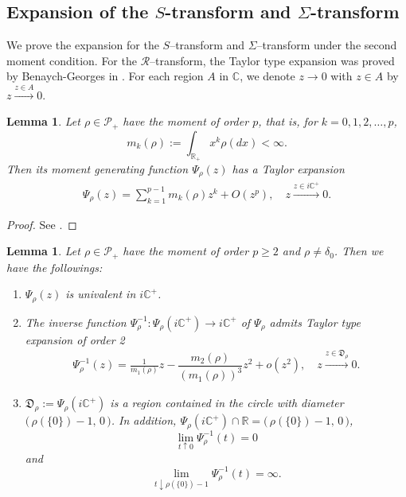 \documentclass[12pt]{amsart}
\newtheorem{lem}[thm]{Lemma}
\theoremstyle{definition}
\numberwithin{equation}{section}
\begin{document}
\subsection{Expansion of the $S$-transform and $\Sigma$-transform}
We prove the expansion for the $S$--transform and $\Sigma$--transform 
under the second moment condition.
For the $\mathcal{R}$--transform, the Taylor type expansion was proved by Benaych-Georges 
in \cite{BG06}. 
For each region $A$ in ${\mathbb{C}}$,
we denote $z \to 0$ with $z \in A$
by $z \overset{z \in A}{\longrightarrow} 0$.
\begin{lem}\label{lemM}
	Let $\rho \in \mathcal{P}_+$ have the moment of order $p$, that is,
	for $k=0,1,2,\ldots ,p$,
		\[
		m_{k}(\rho):=\int_{{\mathbb{R}}_+} x^k \rho (dx) < \infty.
		\]
	Then its moment generating function $\Psi_{\rho}(z)$ has a Taylor expansion
		\begin{align*}
		\Psi_{\rho}(z) = \sum_{k=1}^{p-1} m_{k}(\rho) z^k + O(z^{p}), 
		\quad z \overset{z \in i{\mathbb{C}}^+}{\longrightarrow} 0.
		\end{align*} 
\end{lem}
\begin{proof}
See \cite{Ak69}.
\end{proof}
\begin{lem}\label{lem}
	Let $\rho \in \mathcal{P}_+$ have the moment of order $p\geq 2$
	 and $\rho \not = \delta_0$.
	 Then we have the followings:
	\begin{enumerate}
		\item[\rm{(1)}] $\Psi_{\rho}(z)$ is univalent in $i{\mathbb{C}}^+$.
		\item[\rm{(2)}] The inverse function 
	$\Psi^{-1}_{\rho} : \Psi_{\rho}(i{\mathbb{C}}^+) \to i{\mathbb{C}}^+$ 
	of $\Psi_{\rho}$ 
	admits Taylor type expansion of order 2
	\begin{align*}
		\Psi^{-1}_{\rho} (z) = \frac{1}{m_1(\rho)} z -\dfrac{m_{2}(\rho)}{(m_{1}(\rho))^{3}} z^{2} + o(z^2),  \quad
		z \overset{z\in \mathfrak{D}_{\rho}}{\longrightarrow} 0.
	\end{align*}
		\item[\rm{(3)}] $\mathfrak{D}_{\rho}:=\Psi_{\rho}(i{\mathbb{C}}^+)$ is a region contained in the circle with diameter
		$\big(\,\rho(\{0\})-1, \,0\,\big)$.
	In addition,  $\Psi_{\rho}(i{\mathbb{C}}^+) \cap {\mathbb{R}}= \big(\,\rho(\{0\})-1,\, 0 \,\big)$,
	\[
	\lim_{t\uparrow 0}\Psi^{-1}_{\rho}(t)=0
	\] 
	and 
	\[
	\lim_{t\downarrow \rho(\{0\})-1}\Psi^{-1}_{\rho}(t)=\infty.
	\]
	\end{enumerate}
\end{lem}
\end{document}
